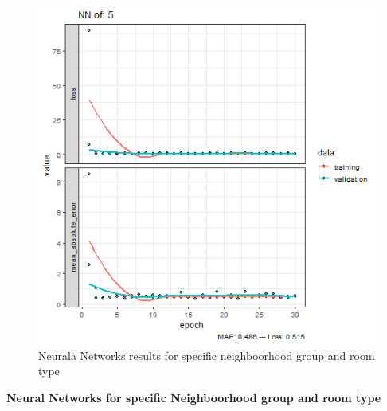 \documentclass{FR16}
\begin{document}
\begin{figure}[!htb]
\begin{minipage}{0.33\textwidth}
   \end{minipage}
   \begin{minipage}{0.33\textwidth}
     \centering
     \includegraphics[width=1\linewidth]{figures/NN-5.png}
   \end{minipage}
        \caption{Neurala Networks results for specific neighboorhood group and room type}\label{fig:20}

\end{figure}

\newpage
\textbf{Neural Networks  for specific Neighboorhood group and room type}
\end{document}
